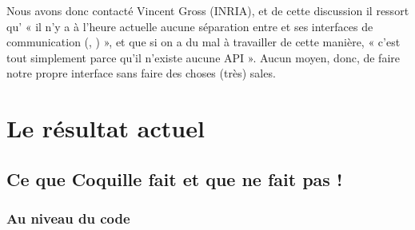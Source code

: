 		Nous avons donc contacté Vincent Gross (INRIA), et de cette discussion il ressort qu' « il n'y a à l'heure actuelle aucune séparation entre \coq{} et ses interfaces de communication (\coqtop{}, \coqide{}) », et que si on a du mal à travailler de cette manière, « c'est tout simplement parce qu'il n'existe aucune API ».
		Aucun moyen, donc, de faire notre propre interface sans faire des choses (très) sales.
				
\section{Le résultat actuel}

    \subsection{Ce que Coquille fait et que \coqide{} ne fait pas !}
    
        \subsubsection{Au niveau du code}
        
